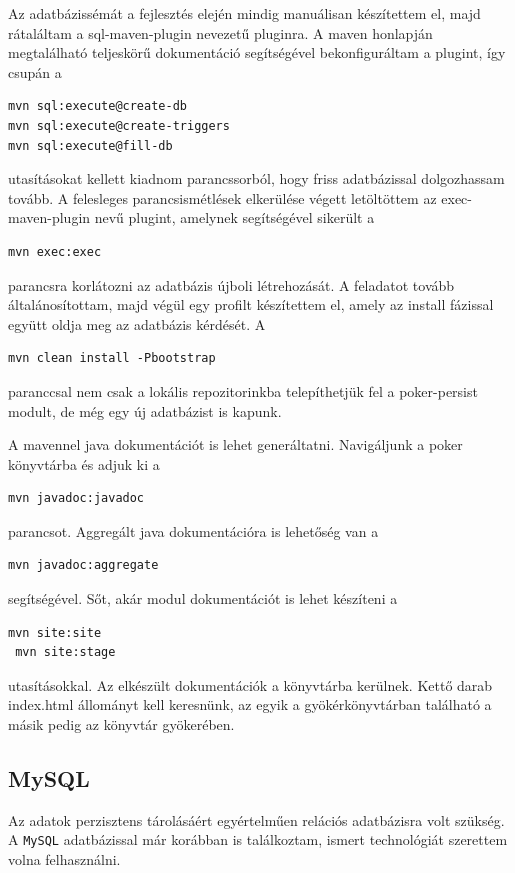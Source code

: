 Az adatbázissémát a fejlesztés elején mindig manuálisan készítettem el, majd rátaláltam a sql-maven-plugin nevezetű pluginra. A maven honlapján megtalálható teljeskörű dokumentáció segítségével bekonfiguráltam a plugint, így csupán a
 \begin{Verbatim}[xleftmargin=.5in]
mvn sql:execute@create-db
mvn sql:execute@create-triggers
mvn sql:execute@fill-db
\end{Verbatim}
utasításokat kellett kiadnom parancssorból, hogy friss adatbázissal dolgozhassam tovább. A felesleges parancsismétlések elkerülése végett letöltöttem az exec-maven-plugin nevű plugint, amelynek segítségével sikerült a 
 \begin{Verbatim}[xleftmargin=.5in]
mvn exec:exec
\end{Verbatim}
parancsra korlátozni az adatbázis újboli létrehozását. A feladatot tovább általánosítottam, majd végül egy profilt készítettem el, amely az install fázissal együtt oldja meg az adatbázis kérdését. A 
 \begin{Verbatim}[xleftmargin=.5in]
 mvn clean install -Pbootstrap
 \end{Verbatim}
paranccsal nem csak a lokális repozitorinkba telepíthetjük fel a poker-persist modult, de még egy új adatbázist is kapunk.

A mavennel java dokumentációt is lehet generáltatni. Navigáljunk a poker könyvtárba és adjuk ki a
\begin{Verbatim}[xleftmargin=.5in]
 mvn javadoc:javadoc
\end{Verbatim}
 parancsot. Aggregált java dokumentációra is lehetőség van a 
 \begin{Verbatim}[xleftmargin=.5in]
 mvn javadoc:aggregate
\end{Verbatim}
segítségével. Sőt, akár modul dokumentációt is lehet készíteni a 
\begin{Verbatim}[xleftmargin=.5in]
 mvn site:site
 mvn site:stage
\end{Verbatim}
utasításokkal. Az elkészült dokumentációk a  könyvtárba kerülnek. Kettő darab index.html állományt kell keresnünk, az egyik a gyökérkönyvtárban található a másik pedig az  könyvtár gyökerében.
 
\subsection{MySQL}
Az adatok perzisztens tárolásáért egyértelműen relációs adatbázisra volt szükség. A \texttt{MySQL} adatbázissal már korábban is találkoztam, ismert technológiát szerettem volna felhasználni.

